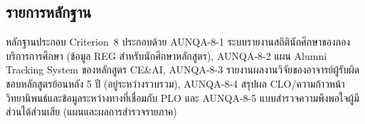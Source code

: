 \subsection*{รายการหลักฐาน}

หลักฐานประกอบ Criterion~8 ประกอบด้วย AUNQA-8-1 ระบบรายงานสถิตินักศึกษาของกองบริการการศึกษา (ข้อมูล REG สำหรับนักศึกษาหลักสูตร), AUNQA-8-2 แผน Alumni Tracking System ของหลักสูตร CE\&AI, AUNQA-8-3 รายงานผลงานวิจัยของอาจารย์ผู้รับผิดชอบหลักสูตรย้อนหลัง 5 ปี (อยู่ระหว่างรวบรวม), AUNQA-8-4 สรุปผล CLO/ความก้าวหน้าวิทยานิพนธ์และข้อมูลระหว่างทางที่เชื่อมกับ PLO และ AUNQA-8-5 แบบสำรวจความพึงพอใจผู้มีส่วนได้ส่วนเสีย (แผนและผลการสำรวจรายภาค)
